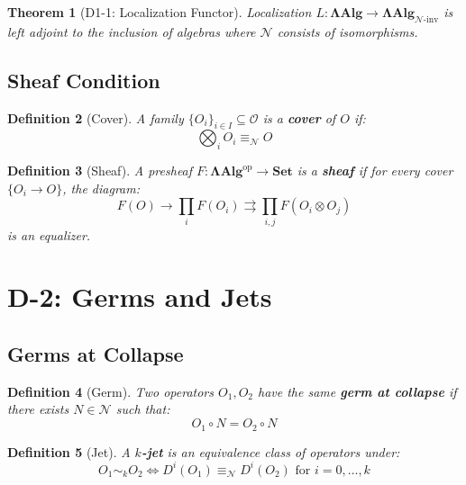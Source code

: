 \documentclass[12pt, oneside]{article}
\newtheorem{theorem}{Theorem}[section]
\newtheorem{definition}[theorem]{Definition}
\newcommand{\N}{\mathcal{N}}
\newcommand{\Opr}{\mathcal{O}}
\begin{document}
\begin{theorem}[D1-1: Localization Functor]
Localization $L: \mathbf{ΛAlg} \rightarrow \mathbf{ΛAlg}_{\N\text{-inv}}$ is left adjoint to the inclusion of algebras where $\N$ consists of isomorphisms.
\end{theorem}

\subsection{Sheaf Condition}

\begin{definition}[Cover]
A family $\{O_i\}_{i \in I} \subseteq \Opr$ is a \textbf{cover} of $O$ if:
\begin{equation}
\bigotimes_i O_i \equiv_\N O
\end{equation}
\end{definition}

\begin{definition}[Sheaf]
A presheaf $F: \mathbf{ΛAlg}^{\text{op}} \rightarrow \mathbf{Set}$ is a \textbf{sheaf} if for every cover $\{O_i \rightarrow O\}$, the diagram:
\begin{equation}
F(O) \rightarrow \prod_i F(O_i) \rightrightarrows \prod_{i,j} F(O_i \otimes O_j)
\end{equation}
is an equalizer.
\end{definition}

\section{D-2: Germs and Jets}

\subsection{Germs at Collapse}

\begin{definition}[Germ]
Two operators $O_1, O_2$ have the same \textbf{germ at collapse} if there exists $N \in \N$ such that:
\begin{equation}
O_1 \circ N = O_2 \circ N
\end{equation}
\end{definition}

\begin{definition}[Jet]
A \textbf{$k$-jet} is an equivalence class of operators under:
\begin{equation}
O_1 \sim_k O_2 \Longleftrightarrow D^i(O_1) \equiv_\N D^i(O_2) \text{ for } i = 0, \ldots, k
\end{equation}
\end{definition}
\end{document}
